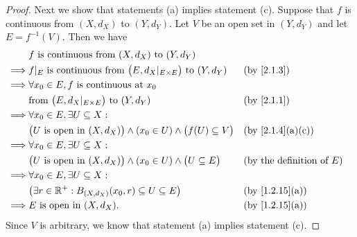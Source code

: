 \begin{proof}
  Next we show that statements (a) implies statement (c).
  Suppose that \(f\) is continuous from \((X, d_X)\) to \((Y, d_Y)\).
  Let \(V\) be an open set in \((Y, d_Y)\) and let \(E = f^{-1}(V)\).
  Then we have
  \begin{align*}
             & f \text{ is continuous from } (X, d_X) \text{ to } (Y, d_Y)                                                                          \\
    \implies & f|_{E} \text{ is continuous from } \big(E, d_X|_{E \times E}\big) \text{ to } (Y, d_Y)      &  & \by{2.1.3}                          \\
    \implies & \forall x_0 \in E, f \text{ is continuous at } x_0                                                                                   \\
             & \text{from } \big(E, d_X|_{E \times E}\big) \text{ to } (Y, d_Y)                            &  & \by{2.1.1}                          \\
    \implies & \forall x_0 \in E, \exists U \subseteq X :                                                                                           \\
             & \big(U \text{ is open in } (X, d_X)\big) \land (x_0 \in U) \land \big(f(U) \subseteq V\big) &  & \text{(by \cref{2.1.4}(a)(c))}      \\
    \implies & \forall x_0 \in E, \exists U \subseteq X :                                                                                           \\
             & \big(U \text{ is open in } (X, d_X)\big) \land (x_0 \in U) \land \big(U \subseteq E\big)    &  & \text{(by the definition of \(E\))} \\
    \implies & \forall x_0 \in E, \exists U \subseteq X :                                                                                           \\
             & \big(\exists r \in \R^+ : B_{(X, d_X)}(x_0, r) \subseteq U \subseteq E\big)                 &  & \text{(by \cref{1.2.15}(a))}        \\
    \implies & E \text{ is open in } (X, d_X).                                                             &  & \text{(by \cref{1.2.15}(a))}
  \end{align*}
  Since \(V\) is arbitrary, we know that statement (a) implies statement (c).


\end{proof}
